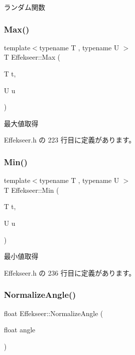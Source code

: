 ランダム関数 

\mbox{\label{namespace_effekseer_afc3d4e56cf4f8d0f12ac7d4bee7591b9}} 
\subsubsection{\texorpdfstring{Max()}{Max()}}
{\footnotesize\ttfamily template$<$typename T , typename U $>$ \\
T Effekseer\+::\+Max (\begin{DoxyParamCaption}\item[{T}]{t,  }\item[{U}]{u }\end{DoxyParamCaption})}



最大値取得 



 Effekseer.\+h の 223 行目に定義があります。

\mbox{\label{namespace_effekseer_ad4d523c19d4088c7566fadd84449eba7}} 
\subsubsection{\texorpdfstring{Min()}{Min()}}
{\footnotesize\ttfamily template$<$typename T , typename U $>$ \\
T Effekseer\+::\+Min (\begin{DoxyParamCaption}\item[{T}]{t,  }\item[{U}]{u }\end{DoxyParamCaption})}



最小値取得 



 Effekseer.\+h の 236 行目に定義があります。

\mbox{\label{namespace_effekseer_a6607039efc8f6bb91f8c216dfd096c5c}} 
\subsubsection{\texorpdfstring{Normalize\+Angle()}{NormalizeAngle()}}
{\footnotesize\ttfamily float Effekseer\+::\+Normalize\+Angle (\begin{DoxyParamCaption}\item[{float}]{angle }\end{DoxyParamCaption})\hspace{0.3cm}{\ttfamily [inline]}}



